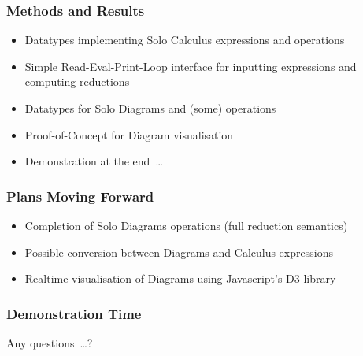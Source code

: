 \documentclass{beamer}
\begin{document}
    \begin{frame}
        \frametitle{Methods and Results}
        \begin{itemize}
            \item Datatypes implementing Solo Calculus expressions and operations
            \item Simple Read-Eval-Print-Loop interface for inputting expressions and computing reductions
            \item Datatypes for Solo Diagrams and (some) operations
            \item Proof-of-Concept for Diagram visualisation
            \item Demonstration at the end~\ldots
        \end{itemize}
    \end{frame}



    \begin{frame}
        \frametitle{Plans Moving Forward}
        \begin{itemize}
            \item Completion of Solo Diagrams operations (full reduction semantics)
            \item Possible conversion between Diagrams and Calculus expressions
            \item Realtime visualisation of Diagrams using Javascript's D3 library
        \end{itemize}
    \end{frame}



    \begin{frame}
        \frametitle{Demonstration Time}
        \begin{center}
            Any questions~\ldots?
        \end{center}
    \end{frame}
\end{document}
